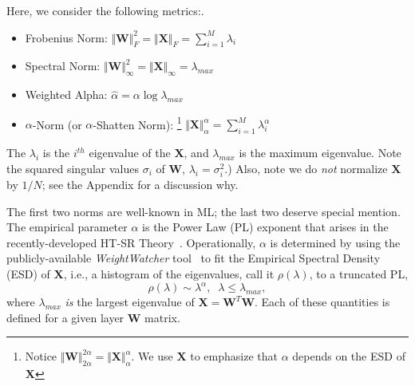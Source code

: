 Here, we consider the following metrics:.

\begin{itemize}
\item 
Frobenius Norm: $\Vert\mathbf{W}\Vert^{2}_{F}=\Vert\mathbf{X}\Vert_{F}=\sum_{i=1}^{M} \lambda_{i}$
\item 
Spectral Norm: $\Vert\mathbf{W}\Vert_{\infty}^{2}=\Vert\mathbf{X}\Vert_{\infty}=\lambda_{max}$
\item 
Weighted Alpha: $\hat{\alpha}=\alpha\log\lambda_{max}$
\item 
$\alpha$-Norm (or $\alpha$-Shatten Norm):
\footnote{Notice  $\Vert\mathbf{W}\Vert^{2\alpha}_{2\alpha}=\Vert\mathbf{X}\Vert^{\alpha}_{\alpha}$. We use $\mathbf{X}$ to emphasize that $\alpha$ depends on the ESD of $\mathbf{X}$}
 $\Vert\mathbf{X}\Vert^{\alpha}_{\alpha}=\sum_{i=1}^{M}\lambda_{i}^{\alpha}$
\end{itemize}

The  $\lambda_{i}$ is the $i^{th}$ eigenvalue of the $\mathbf{X}$, 
and $\lambda_{max}$ is the maximum eigenvalue.
Note the squared singular values $\sigma_{i}$ of $\mathbf{W}$, $\lambda_{i}=\sigma^{2}_{i}$.)
Also, note we do \emph{not} normalize $\mathbf{X}$ by $1/N$; see the Appendix for a discussion why.

The first two norms are well-known in ML; the last two deserve special mention.
The empirical parameter $\alpha$ is the Power Law (PL) exponent that arises in the recently-developed HT-SR Theory~\cite{MM18_TR, MM19_HTSR_ICML, MM20_SDM}.
Operationally, $\alpha$ is determined by using the publicly-available \emph{WeightWatcher} tool~\cite{weightwatcher_package} to fit the Empirical Spectral Density (ESD) of $\mathbf{X}$, i.e., a histogram of the eigenvalues, call it $\rho(\lambda)$, to a truncated PL, 
\begin{equation}
\rho(\lambda)\sim\lambda^{\alpha},\;\;\lambda\le\lambda_{max}  ,
\end{equation}
where $\lambda_{max}$ \emph{is} the largest eigenvalue of $\mathbf{X}=\mathbf{W}^{T}\mathbf{W}$.
Each of these quantities is defined for a given layer $\mathbf{W}$ matrix.

